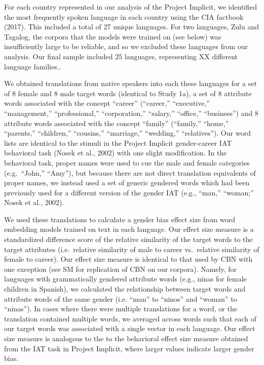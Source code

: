 \documentclass[man,floatsintext]{apa6}
\theoremstyle{definition}
\theoremstyle{definition}
\theoremstyle{definition}
\theoremstyle{remark}
\begin{document}
For each country represented in our analysis of the Project Implicit, we
identified the most frequently spoken language in each country using the
CIA factbook (2017). This included a total of 27 unique languages. For
two languages, Zulu and Tagalog, the corpora that the models were
trained on (see below) was insufficiently large to be reliable, and so
we excluded these languages from our analysis. Our final sample included
25 languages, representing XX different language families..

We obtained translations from native speakers into each these languages
for a set of 8 female and 8 male target words (identical to Study 1a), a
set of 8 attribute words associated with the concept \enquote{career}
(\enquote{career,} \enquote{executive,} \enquote{management,}
\enquote{professional,} \enquote{corporation,} \enquote{salary,}
\enquote{office,} \enquote{business}) and 8 attribute words associated
with the concept \enquote{family} (\enquote{family,} \enquote{home,}
\enquote{parents,} \enquote{children,} \enquote{cousins,}
\enquote{marriage,} \enquote{wedding,} \enquote{relatives}). Our word
lists are identical to the stimuli in the Project Implicit gender-career
IAT behavioral task (Nosek et al., 2002) with one slight modification.
In the behavioral task, proper names were used to cue the male and
female categories (e.g.~\enquote{John,} \enquote{Amy}), but because
there are not direct translation equivalents of proper names, we instead
used a set of generic gendered words which had been previously used for
a different version of the gender IAT (e.g., ``man,'' ``woman;'' Nosek
et al., 2002).

We used these translations to calculate a gender bias effect size from
word embedding models trained on text in each language. Our effect size
measure is a standardized difference score of the relative similarity of
the target words to the target attributes (i.e.~relative similarity of
male to career vs.~relative similarity of female to career). Our effect
size measure is identical to that used by CBN with one exception (see SM
for replication of CBN on our corpora). Namely, for languages with
grammatically gendered attribute words (e.g., ninas for female children
in Spanish), we calculated the relationship between target words and
attribute words of the same gender (i.e. \enquote{man} to
\enquote{ninos} and \enquote{woman} to \enquote{ninas}). In cases where
there were multiple translations for a word, or the translation
contained multiple words, we averaged across words such that each of our
target words was associated with a single vector in each language. Our
effect size measure is analogous to the to the behavioral effect size
measure obtained from the IAT task in Project Implicit, where larger
values indicate larger gender bias.
\end{document}
